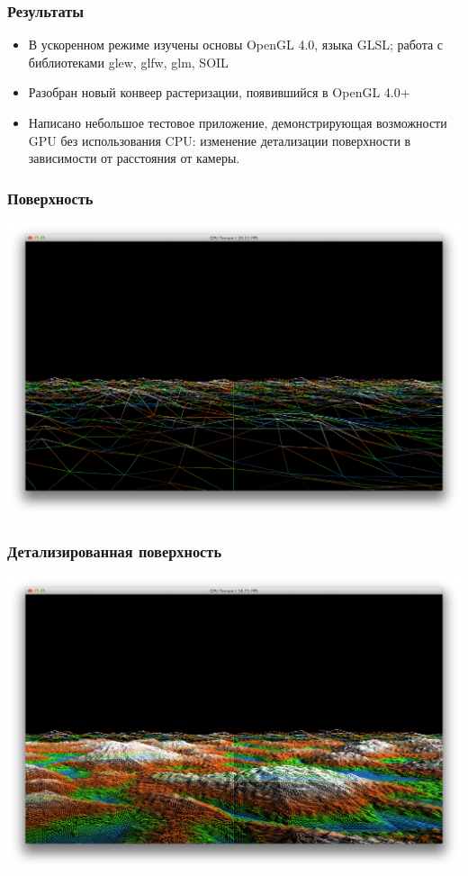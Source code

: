 \documentclass{beamer}
\begin{document}
    \begin{frame}\frametitle{Результаты}
        \begin{itemize}%
            \item	В ускоренном режиме изучены основы OpenGL 4.0, языка GLSL; работа с библиотеками glew, glfw, glm, SOIL
            \item	Разобран новый конвеер растеризации, появившийся в OpenGL 4.0+
            \item	Написано небольшое тестовое приложение, демонстрирующая возможности GPU без использования CPU: изменение детализации поверхности в зависимости от расстояния от камеры.
        \end{itemize}
    \end{frame}

    \begin{frame}\frametitle{Поверхность}
        \begin{center}
        	\includegraphics[scale=0.2]{1.png}\\
        \end{center}
    \end{frame}
    
    \begin{frame}\frametitle{Детализированная поверхность}
        \begin{center}
            \includegraphics[scale=0.2]{2.png}\\
        \end{center}
    \end{frame}
\end{document}
